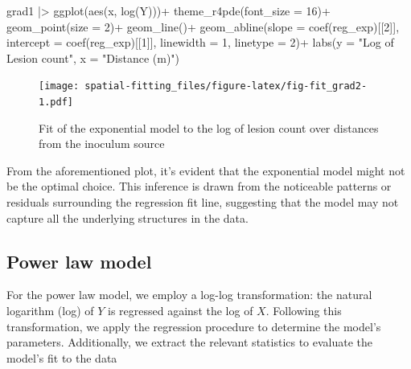 \documentclass[
  letterpaper,
]{book}
\newenvironment{Shaded}{\begin{snugshade}}{\end{snugshade}}
\newcommand{\AttributeTok}[1]{\textcolor[rgb]{0.40,0.45,0.13}{#1}}
\newcommand{\DecValTok}[1]{\textcolor[rgb]{0.68,0.00,0.00}{#1}}
\newcommand{\FunctionTok}[1]{\textcolor[rgb]{0.28,0.35,0.67}{#1}}
\newcommand{\NormalTok}[1]{\textcolor[rgb]{0.00,0.23,0.31}{#1}}
\newcommand{\SpecialCharTok}[1]{\textcolor[rgb]{0.37,0.37,0.37}{#1}}
\newcommand{\StringTok}[1]{\textcolor[rgb]{0.13,0.47,0.30}{#1}}
\begin{document}
\begin{Shaded}
\begin{Highlighting}[]
\NormalTok{grad1 }\SpecialCharTok{|\textgreater{}} 
  \FunctionTok{ggplot}\NormalTok{(}\FunctionTok{aes}\NormalTok{(x, }\FunctionTok{log}\NormalTok{(Y)))}\SpecialCharTok{+}
  \FunctionTok{theme\_r4pde}\NormalTok{(}\AttributeTok{font\_size =} \DecValTok{16}\NormalTok{)}\SpecialCharTok{+}
  \FunctionTok{geom\_point}\NormalTok{(}\AttributeTok{size =} \DecValTok{2}\NormalTok{)}\SpecialCharTok{+}
  \FunctionTok{geom\_line}\NormalTok{()}\SpecialCharTok{+}
  \FunctionTok{geom\_abline}\NormalTok{(}\AttributeTok{slope =} \FunctionTok{coef}\NormalTok{(reg\_exp)[[}\DecValTok{2}\NormalTok{]], }\AttributeTok{intercept =} \FunctionTok{coef}\NormalTok{(reg\_exp)[[}\DecValTok{1}\NormalTok{]],}
              \AttributeTok{linewidth =} \DecValTok{1}\NormalTok{, }\AttributeTok{linetype =} \DecValTok{2}\NormalTok{)}\SpecialCharTok{+}
 \FunctionTok{labs}\NormalTok{(}\AttributeTok{y =} \StringTok{"Log of Lesion count"}\NormalTok{,}
       \AttributeTok{x =} \StringTok{"Distance (m)"}\NormalTok{)}
\end{Highlighting}
\end{Shaded}

\begin{figure}

{\centering \texttt{[image: spatial-fitting\_files/figure-latex/fig-fit\_grad2-1.pdf]}

}

\caption{\label{fig-fit_grad2}Fit of the exponential model to the log of
lesion count over distances from the inoculum source}

\end{figure}

From the aforementioned plot, it's evident that the exponential model
might not be the optimal choice. This inference is drawn from the
noticeable patterns or residuals surrounding the regression fit line,
suggesting that the model may not capture all the underlying structures
in the data.

\hypertarget{power-law-model-1}{%
\subsection{Power law model}\label{power-law-model-1}}

For the power law model, we employ a log-log transformation: the natural
logarithm (log) of \(Y\) is regressed against the log of \(X\).
Following this transformation, we apply the regression procedure to
determine the model's parameters. Additionally, we extract the relevant
statistics to evaluate the model's fit to the data
\end{document}
